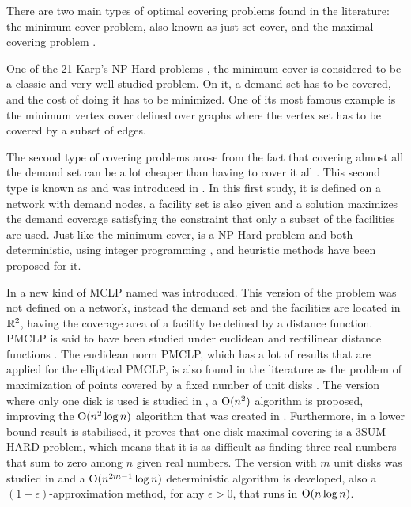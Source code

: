 There are two main types of optimal covering problems found in the literature: the minimum cover problem, also known as just set cover, and the maximal covering problem \cite{karatas}. 

One of the 21 Karp's NP-Hard problems \cite{karp}, the minimum cover is considered to be a classic and very well studied problem. On it, a demand set has to be covered, and the cost of doing it has to be minimized. One of its most famous example is the minimum vertex cover defined over graphs where the vertex set has to be covered by a subset of edges.

The second type of covering problems arose from the fact that covering almost all the demand set can be a lot cheaper than having to cover it all \cite{garcia}. This second type is known as  and was introduced in \cite{church:1974}. In this first study, it is defined on a network with demand nodes, a facility set is also given and a solution maximizes the demand coverage satisfying the constraint that only a subset of the facilities are used. Just like the minimum cover, \MCLP is a NP-Hard problem \cite{hatta:2013} and both deterministic, using integer programming \cite{church:1974}, and heuristic methods \cite{revelle:2008} have been proposed for it. 

In \cite{church:1984} a new kind of MCLP named  was introduced. This version of the problem was not defined on a network, instead the demand set and the facilities are located in $\mathbb{R}^2$, having the coverage area of a facility be defined by a distance function. PMCLP is said to have been studied under euclidean and rectilinear distance functions \cite{younies}. The euclidean norm PMCLP, which has a lot of results that are applied for the elliptical PMCLP, is also found in the literature as the problem of maximization of points covered by a fixed number of unit disks \cite{cabello:2006}. The version where only one disk is used is studied in \cite{chazelle:1986}, a $\mathrm{O}(n^2)$ algorithm is proposed, improving the $\mathrm{O}(n^2\log{n})$ algorithm that was created in \cite{drezner}. Furthermore, in \cite{aronov:2008} a lower bound result is stabilised, it proves that one disk maximal covering is a 3SUM-HARD problem, which means that it is as difficult as finding three real numbers that sum to zero among $n$ given real numbers. The version with $m$ unit disks was studied in \cite{cabello:2006} and a $\mathrm{O}(n^{2m-1}\log{n})$ deterministic algorithm is developed, also a $(1-\epsilon)$-approximation method, for any $\epsilon > 0$, that runs in $\mathrm{O}(n\log{n})$. 



